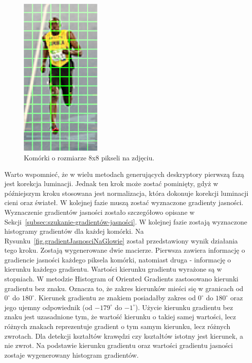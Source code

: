\documentclass[a4paper,twoside,12pt]{book}
\begin{document}
    \begin{figure}
        \centering
        \includegraphics[width=4cm]{Obrazy/komorkiHoga.jpg}
        \caption{Komórki o rozmiarze 8x8 pikseli na zdjęciu.~\cite{hogOpenCv}}
        \label{fig.komorkiHoga}
    \end{figure}
    Warto wspomnieć, że w wielu metodach generujących deskryptory pierwszą fazą jest korekcja luminacji.
    Jednak ten krok może zostać pominięty, gdyż w późniejszym kroku stosowana jest normalizacja,
    która dokonuje korekcji luminacji cieni oraz świateł.
    W kolejnej fazie muszą zostać wyznaczone gradienty jasności.
    Wyznaczenie gradientów jasności zostało szczegółowo opisane w Sekcji~\ref{subsec:szukanie-gradientów-jasności}.
    W kolejnej fazie zostają wyznaczone histogramy gradientów dla każdej komórki.
    Na Rysunku~\ref{fig.gradientJasnosciNaGlowie} został przedstawiony wynik działania tego kroku.
    Zostają wygenerowane dwie macierze. Pierwsza zawiera informację o gradiencie jasności każdego piksela komórki,
    natomiast druga - informację o kierunku każdego gradientu.
    Wartości kierunku gradientu wyrażone są w stopniach. W metodzie Histogram of Oriented Gradients
    zastosowano kierunki gradientu bez znaku. Oznacza to, że zakres kierunków mieści się w granicach od $0^{\circ}$ do $180^{\circ}$.
    Kierunek gradientu ze znakiem posiadałby zakres od $0^{\circ}$ do $180^{\circ}$ oraz jego ujemny odpowiednik
    (od $-179^{\circ}$ do $-1^{\circ}$). Użycie kierunku gradientu bez znaku jest uzasadnione tym,
    że wartość kierunku o takiej samej wartości, lecz różnych znakach reprezentuje gradient o tym samym kierunku, lecz
    różnych zwrotach. Dla detekcji kształtów krawędzi czy kształtów istotny jest kierunek, a nie zwrot.
    Na podstawie kierunku gradientu oraz wartości gradientu jasności zostaje wygenerowany histogram gradientów.
\end{document}
